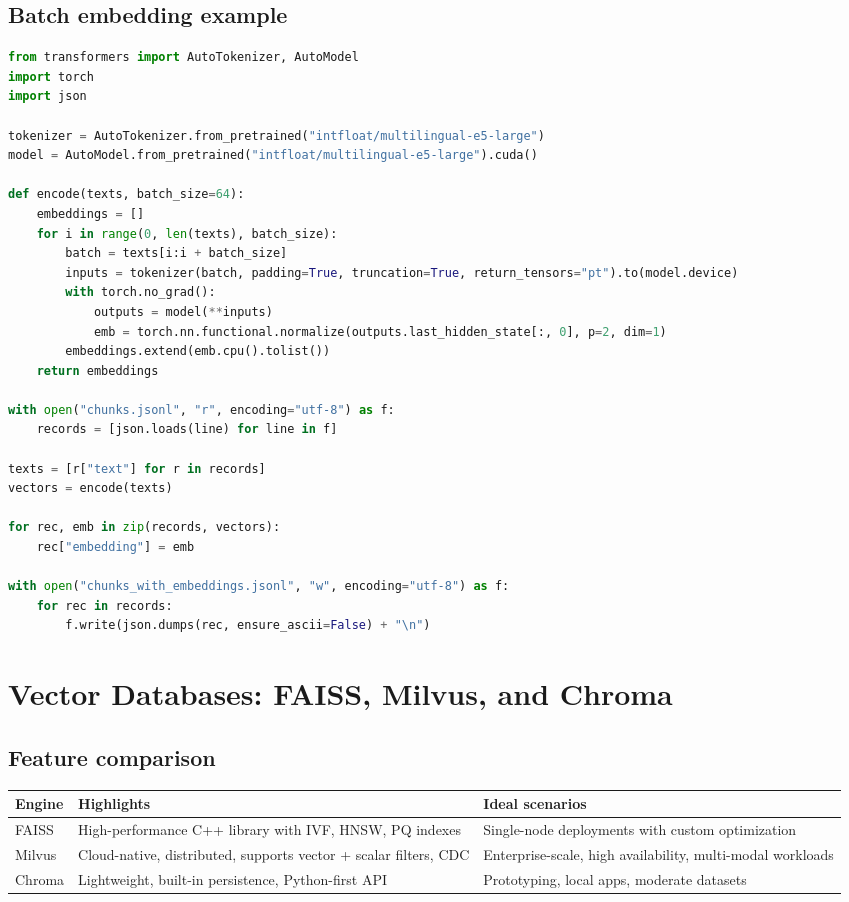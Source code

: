 \documentclass{article}
\begin{document}
\subsection{Batch embedding example}
\begin{lstlisting}[language=Python,caption={Batch encoding chunks with HuggingFace Transformers}]
from transformers import AutoTokenizer, AutoModel
import torch
import json

tokenizer = AutoTokenizer.from_pretrained("intfloat/multilingual-e5-large")
model = AutoModel.from_pretrained("intfloat/multilingual-e5-large").cuda()

def encode(texts, batch_size=64):
    embeddings = []
    for i in range(0, len(texts), batch_size):
        batch = texts[i:i + batch_size]
        inputs = tokenizer(batch, padding=True, truncation=True, return_tensors="pt").to(model.device)
        with torch.no_grad():
            outputs = model(**inputs)
            emb = torch.nn.functional.normalize(outputs.last_hidden_state[:, 0], p=2, dim=1)
        embeddings.extend(emb.cpu().tolist())
    return embeddings

with open("chunks.jsonl", "r", encoding="utf-8") as f:
    records = [json.loads(line) for line in f]

texts = [r["text"] for r in records]
vectors = encode(texts)

for rec, emb in zip(records, vectors):
    rec["embedding"] = emb

with open("chunks_with_embeddings.jsonl", "w", encoding="utf-8") as f:
    for rec in records:
        f.write(json.dumps(rec, ensure_ascii=False) + "\n")
\end{lstlisting}

\section{Vector Databases: FAISS, Milvus, and Chroma}
\subsection{Feature comparison}
\begin{longtable}{p{3.2cm}p{4cm}p{6cm}}
\toprule
Engine & Highlights & Ideal scenarios \\
\midrule
FAISS & High-performance C++ library with IVF, HNSW, PQ indexes & Single-node deployments with custom optimization \\
Milvus & Cloud-native, distributed, supports vector + scalar filters, CDC & Enterprise-scale, high availability, multi-modal workloads \\
Chroma & Lightweight, built-in persistence, Python-first API & Prototyping, local apps, moderate datasets \\
\bottomrule
\end{longtable}
\end{document}
